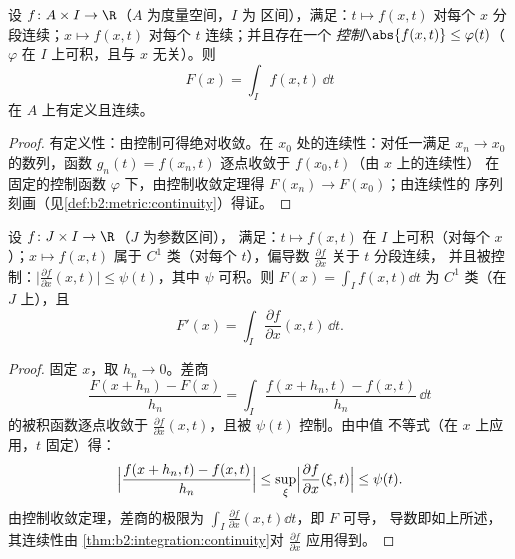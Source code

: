 \begin{theorem}[积分号下的连续性]\label{thm:b2:integration:continuity}
设 $f \colon A \times I \to \R$（$A$ 为度量空间，$I$ 为
区间），满足：$t \mapsto f(x, t)$ 对每个
$x$ 分段连续；$x \mapsto f(x, t)$ 对每个 $t$ 连续；并且存在一个
\emph{控制}$\abs{f(x,t)} \leq \varphi(t)$（$\varphi$
在 $I$ 上可积，且与 $x$ 无关）。则
\[
F(x) = \int_I f(x, t)\,\dd t
\]
在 $A$ 上有定义且连续。
\end{theorem}

\begin{proof}
有定义性：由控制可得绝对收敛。在
$x_0$ 处的连续性：对任一满足 $x_n \to x_0$ 的数列，函数 $g_n(t) =
f(x_n, t)$ 逐点收敛于 $f(x_0, t)$（由 $x$ 上的连续性）
在固定的控制函数 $\varphi$ 下，由控制收敛定理得
$F(x_n) \to F(x_0)$；由连续性的
序列刻画（见\cref{def:b2:metric:continuity}）得证。
\end{proof}

\begin{theorem}[积分号下的求导]\label{thm:b2:integration:leibnizrule}
设 $f \colon J \times I \to \R$（$J$ 为参数区间），
满足：$t \mapsto f(x,t)$ 在 $I$ 上可积（对每个 $x$）；$x \mapsto
f(x,t)$ 属于 $C^1$ 类（对每个 $t$），偏导数
$\frac{\partial f}{\partial x}$ 关于 $t$ 分段连续，
并且被控制：$\bigl|\frac{\partial f}{\partial x}(x,t)\bigr| \leq
\psi(t)$，其中 $\psi$ 可积。则 $F(x) = \int_I f(x,t)\dd t$
为 $C^1$ 类（在 $J$ 上），且
\[
F'(x) = \int_I \frac{\partial f}{\partial x}(x, t)\,\dd t .
\]
\end{theorem}

\begin{proof}
固定 $x$，取 $h_n \to 0$。差商
\[
\frac{F(x + h_n) - F(x)}{h_n}
= \int_I \frac{f(x + h_n, t) - f(x, t)}{h_n}\,\dd t
\]
的被积函数逐点收敛于 $\frac{\partial f}{\partial
x}(x, t)$，且被 $\psi(t)$ 控制。由中值
不等式（在 $x$ 上应用，$t$ 固定）得：
\[
\Bigl|\frac{f(x + h_n, t) - f(x,t)}{h_n}\Bigr|
\leq \sup_{\xi} \Bigl|\frac{\partial f}{\partial x}(\xi, t)\Bigr|
\leq \psi(t) .
\]
由控制收敛定理，差商的极限为 $\int_I \frac{\partial
f}{\partial x}(x,t)\dd t$，即 $F$ 可导，
导数即如上所述，其连续性由
\cref{thm:b2:integration:continuity}对 $\frac{\partial
f}{\partial x}$ 应用得到。
\end{proof}

